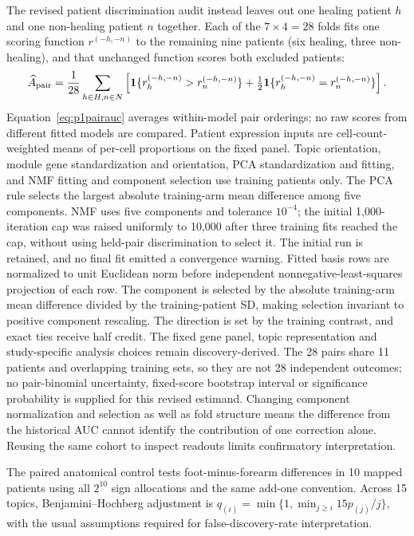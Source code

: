 \documentclass[10pt,a4paper]{article}
\begin{document}
The revised patient discrimination audit instead leaves out one healing patient $h$ and one non-healing patient $n$ together. Each of the $7\times4=28$ folds fits one scoring function $r^{(-h,-n)}$ to the remaining nine patients (six healing, three non-healing), and that unchanged function scores both excluded patients:
\begin{equation}
\widehat A_{\rm pair}=\frac1{28}\sum_{h\in H,n\in N}\left[\mathbf{1}\{r^{(-h,-n)}_h>r^{(-h,-n)}_n\}+\tfrac12\mathbf{1}\{r^{(-h,-n)}_h=r^{(-h,-n)}_n\}\right].\label{eq:p1pairauc}
\end{equation}
Equation~\eqref{eq:p1pairauc} averages within-model pair orderings; no raw scores from different fitted models are compared. Patient expression inputs are cell-count-weighted means of per-cell proportions on the fixed panel. Topic orientation, module gene standardization and orientation, PCA standardization and fitting, and NMF fitting and component selection use training patients only. The PCA rule selects the largest absolute training-arm mean difference among five components. NMF uses five components and tolerance $10^{-4}$; the initial 1,000-iteration cap was raised uniformly to 10,000 after three training fits reached the cap, without using held-pair discrimination to select it. The initial run is retained, and no final fit emitted a convergence warning. Fitted basis rows are normalized to unit Euclidean norm before independent nonnegative-least-squares projection of each row. The component is selected by the absolute training-arm mean difference divided by the training-patient SD, making selection invariant to positive component rescaling. The direction is set by the training contrast, and exact ties receive half credit. The fixed gene panel, topic representation and study-specific analysis choices remain discovery-derived. The 28 pairs share 11 patients and overlapping training sets, so they are not 28 independent outcomes; no pair-binomial uncertainty, fixed-score bootstrap interval or significance probability is supplied for this revised estimand. Changing component normalization and selection as well as fold structure means the difference from the historical AUC cannot identify the contribution of one correction alone. Reusing the same cohort to inspect readouts limits confirmatory interpretation.

The paired anatomical control tests foot-minus-forearm differences in 10 mapped patients using all $2^{10}$ sign allocations and the same add-one convention. Across 15 topics, Benjamini--Hochberg adjustment is $q_{(i)}=\min\{1,\min_{j\geq i}15p_{(j)}/j\}$, with the usual assumptions required for false-discovery-rate interpretation.
\end{document}
